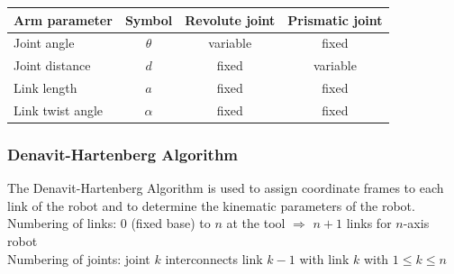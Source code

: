 \documentclass[12pt]{article}
\begin{document}
	\begin{tabular}{|l|c|c|c|}
		\hline
		\textbf{Arm parameter} & \textbf{Symbol} & \textbf{Revolute joint} & \textbf{Prismatic joint} \\ \hline
		Joint angle            &    $\theta$     &        variable         &          fixed           \\ \hline
		Joint distance         &       $d$       &          fixed          &         variable         \\ \hline
		Link length            &       $a$       &          fixed          &          fixed           \\ \hline
		Link twist angle       &    $\alpha$     &          fixed          &          fixed           \\ \hline
	\end{tabular} 
	
	\subsubsection{Denavit-Hartenberg Algorithm}
	The Denavit-Hartenberg Algorithm is used to assign coordinate frames to each link of the robot and to determine the kinematic parameters of the robot.\\
	Numbering of links: $0$ (fixed base) to $n$ at the tool $\Rightarrow$ $n+1$ links for $n$-axis robot\\
	Numbering of joints: joint $k$ interconnects link $k-1$ with link $k$ with $1 \leq k \leq n$
\end{document}
